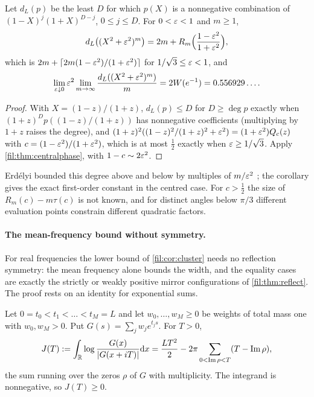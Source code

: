 \begin{corollary}\label{fil:cor:lorentz}
Let $d_L(p)$ be the least $D$ for which $p(X)$ is a nonnegative combination of $(1-X)^j(1+X)^{D-j}$,
$0\le j\le D$. For $0<\varepsilon<1$ and $m\ge1$,
\[
 d_L\bigl((X^2+\varepsilon^2)^m\bigr)=2m+R_m\Bigl(\frac{1-\varepsilon^2}{1+\varepsilon^2}\Bigr),
\]
which is $2m+\lceil2m(1-\varepsilon^2)/(1+\varepsilon^2)\rceil$ for $1/\sqrt3\le\varepsilon<1$, and
\[
 \lim_{\varepsilon\downarrow0}\varepsilon^2\lim_{m\to\infty}\frac{d_L((X^2+\varepsilon^2)^m)}m=2W(e^{-1})=0.556929\ldots .
\]
\end{corollary}

\begin{proof}
With $X=(1-z)/(1+z)$, $d_L(p)\le D$ for $D\ge\deg p$ exactly when $(1+z)^Dp((1-z)/(1+z))$ has nonnegative
coefficients (multiplying by $1+z$ raises the degree), and $(1+z)^2((1-z)^2/(1+z)^2+\varepsilon^2)=(1+\varepsilon^2)Q_c(z)$ with
$c=(1-\varepsilon^2)/(1+\varepsilon^2)$, which is at most $\tfrac12$ exactly when $\varepsilon\ge1/\sqrt3$. Apply
\cref{fil:thm:centralphase}, with $1-c\sim2\varepsilon^2$.
\end{proof}

Erd\'elyi bounded this degree above and below by multiples of $m/\varepsilon^2$ \cite{Erdelyi1991Estimates}; the
corollary gives the exact first-order constant in the centred case. For $c>\tfrac12$ the size of
$R_m(c)-m\tau(c)$ is not known, and for distinct angles below $\pi/3$ different evaluation points constrain
different quadratic factors.

\paragraph{The mean-frequency bound without symmetry.}
For real frequencies the lower bound of \cref{fil:cor:cluster} needs no reflection symmetry: the mean
frequency alone bounds the width, and the equality cases are exactly the strictly or weakly positive
mirror configurations of \cref{fil:thm:reflect}. The proof rests on an identity for exponential sums.

\begin{lemma}\label{fil:lem:strip}
Let $0=t_0<t_1<\dots<t_M=L$ and let $w_0,\dots,w_M\ge0$ be weights of total mass one with $w_0,w_M>0$.
Put $G(s)=\sum_jw_je^{t_js}$. For $T>0$,
\[
 J(T):=\int_{\mathbb{R}}\log\frac{G(x)}{\lvert G(x+iT)\rvert}\mathrm{d} x=\frac{LT^2}2-2\pi\sum_{0<\operatorname{Im}\rho<T}(T-\operatorname{Im}\rho),
\]
the sum running over the zeros $\rho$ of $G$ with multiplicity. The integrand is nonnegative, so
$J(T)\ge0$.
\end{lemma}

